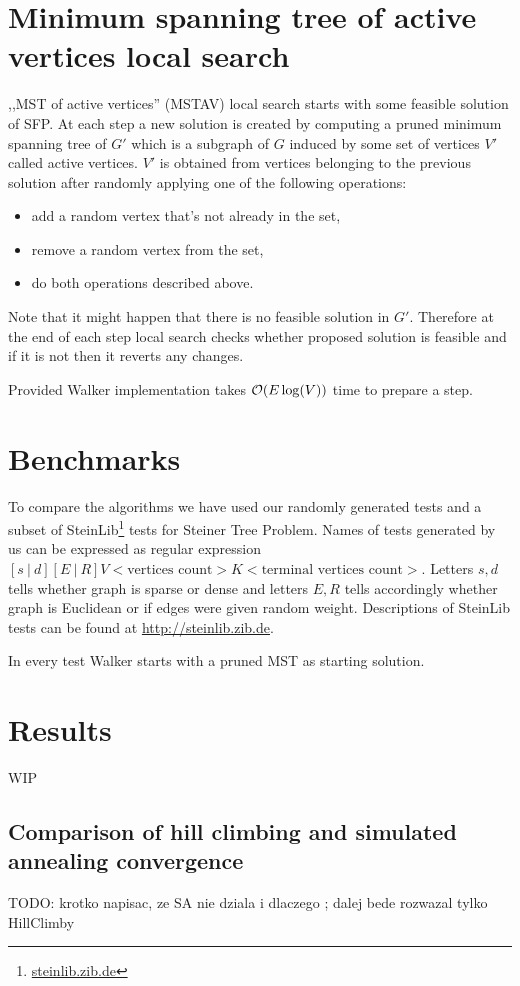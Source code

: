 \section{Minimum spanning tree of active vertices local search}
,,MST of active vertices'' (MSTAV) local search starts with some feasible solution of SFP. At each step a new solution is created by computing a pruned minimum spanning tree of $G'$ which is a subgraph of $G$ induced by some set of vertices $V'$ called active vertices. $V'$ is obtained from vertices belonging to the previous solution after randomly applying one of the following operations:
\begin{itemize}
\item add a random vertex that's not already in the set,
\item remove a random vertex from the set,
\item do both operations described above.
\end{itemize}

Note that it might happen that there is no feasible solution in $G'$. Therefore at the end of each step local search checks whether proposed solution is feasible and if it is not then it reverts any changes.

Provided Walker implementation takes $\mathcal{O}(E \log(V))$ time to prepare a step.

\section{Benchmarks}
To compare the algorithms we have used our randomly generated tests and a subset of SteinLib\footnote{\url{steinlib.zib.de}} tests for Steiner Tree Problem.
Names of tests generated by us can be expressed as regular expression $[s\ |\ d][E\ |\ R]V<\text{vertices count}>K<\text{terminal vertices count}>$. Letters $s, d$ tells whether graph is sparse or dense and letters $E, R$ tells accordingly whether graph is Euclidean or if edges were given random weight. Descriptions of SteinLib tests can be found at \url{http://steinlib.zib.de}.

In every test Walker starts with a pruned MST as starting solution.
\section{Results}
WIP

\subsection{Comparison of hill climbing and simulated annealing convergence}
TODO: krotko napisac, ze SA nie dziala i dlaczego ; dalej bede rozwazal tylko HillClimby

